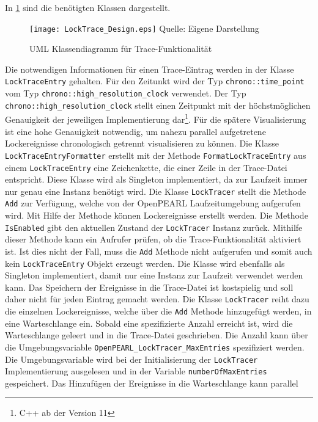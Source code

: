 In \cref{fig:LockTrace_Design} sind die benötigten Klassen dargestellt.
\begin{figure}[ht]
  \texttt{[image: LockTrace\_Design.eps]}
  \footnotesize\sffamily Quelle: Eigene Darstellung
  \caption{UML Klassendiagramm für Trace-Funktionalität}
  \label{fig:LockTrace_Design}
\end{figure}
Die notwendigen Informationen für einen Trace-Eintrag werden in der Klasse
\texttt{Lock\-Trace\-Entry} gehalten. Für den Zeitunkt wird der Typ 
\texttt{chrono::\-time\_point} vom Typ \texttt{chrono::\-high\_resolution\_clock}
verwendet. Der Typ \texttt{chrono::\-high\_resolution\_clock} stellt einen
Zeitpunkt mit der höchstmöglichen Genauigkeit der jeweiligen Implementierung
dar\footnote{C++ ab der Version 11}. Für die spätere Visualisierung ist eine
hohe Genauigkeit notwendig, um nahezu parallel aufgetretene Lockereignisse
chronologisch getrennt visualisieren zu können. Die Klasse
\texttt{Lock\-Trace\-Entry\-Formatter} erstellt mit der Methode
\texttt{Format\-Lock\-Trace\-Entry} aus einem \texttt{Lock\-Trace\-Entry} eine
Zeichenkette, die einer Zeile in der Trace-Datei entspricht. Diese Klasse wird
als Singleton implementiert, da zur Laufzeit immer nur genau eine Instanz
benötigt wird. Die Klasse \texttt{Lock\-Tracer} stellt die Methode \texttt{Add}
zur Verfügung, welche von der OpenPEARL Laufzeitumgebung aufgerufen wird. Mit
Hilfe der Methode können Lockereignisse erstellt werden. Die Methode
\texttt{IsEnabled} gibt den aktuellen Zustand der \texttt{Lock\-Tracer} Instanz
zurück. Mithilfe dieser Methode kann ein Aufrufer prüfen, ob die
Trace-Funktionalität aktiviert ist. Ist dies nicht der Fall, muss die
\texttt{Add} Methode nicht aufgerufen und somit auch kein
\texttt{Lock\-Trace\-Entry} Objekt erzeugt werden. Die Klasse wird ebenfalls als
Singleton implementiert, damit nur eine Instanz zur Laufzeit verwendet werden
kann. Das Speichern der Ereignisse in die Trace-Datei ist kostspielig und soll
daher nicht für jeden Eintrag gemacht werden. Die Klasse \texttt{Lock\-Tracer}
reiht dazu die einzelnen Lockereignisse, welche über die \texttt{Add} Methode
hinzugefügt werden, in eine Warteschlange ein. Sobald eine spezifizierte Anzahl
erreicht ist, wird die Warteschlange geleert und in die Trace-Datei geschrieben.
Die Anzahl kann über die Umgebungsvariable
\texttt{OpenPEARL\_LockTracer\_MaxEntries} spezifiziert werden. Die
Umgebungsvariable wird bei der Initialisierung der \texttt{Lock\-Tracer}
Implementierung ausgelesen und in der Variable \texttt{number\-Of\-Max\-Entries}
gespeichert. Das Hinzufügen der Ereignisse in die Warteschlange kann parallel
